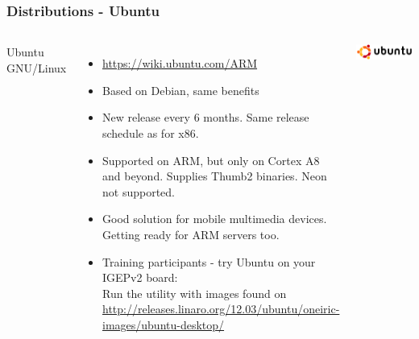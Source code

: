 \begin{frame}
  \frametitle{Distributions - Ubuntu}
  \small
  \begin{columns}[T]
    Ubuntu GNU/Linux
    \begin{itemize}
    \item \url{https://wiki.ubuntu.com/ARM}
    \item Based on Debian, same benefits
    \item New release every 6 months. Same release schedule as for
      x86.
    \item Supported on ARM, but only on Cortex A8 and beyond.
      Supplies Thumb2 binaries. Neon not supported.
    \item Good solution for mobile multimedia devices. Getting ready
      for ARM servers too.
    \item Training participants - try Ubuntu on your IGEPv2 board:\\
      Run the  utility with images found on
      \url{http://releases.linaro.org/12.03/ubuntu/oneiric-images/ubuntu-desktop/}
    \end{itemize}
    \includegraphics[width=\textwidth]{slides/sysdev-embedded-linux/ubuntu.png}\\
  \end{columns}
\end{frame}

